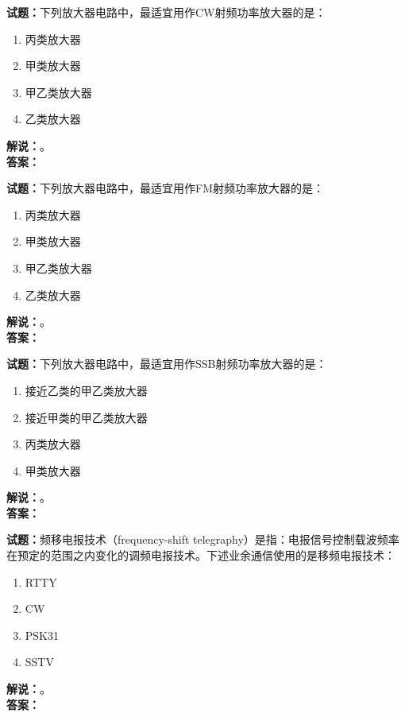 \documentclass{ctexbook}
\begin{document}
\vspace{\baselineskip}

\noindent\textbf{试题：}下列放大器电路中，最适宜用作CW射频功率放大器的是：
\begin{enumerate}[leftmargin=3em]
  \item 丙类放大器
  \item 甲类放大器
  \item 甲乙类放大器
  \item 乙类放大器
\end{enumerate}
\noindent\textbf{解说：}\textbf{}。\\\noindent\textbf{答案：}

\vspace{\baselineskip}

\noindent\textbf{试题：}下列放大器电路中，最适宜用作FM射频功率放大器的是：
\begin{enumerate}[leftmargin=3em]
  \item 丙类放大器
  \item 甲类放大器
  \item 甲乙类放大器
  \item 乙类放大器
\end{enumerate}
\noindent\textbf{解说：}\textbf{}。\\\noindent\textbf{答案：}

\vspace{\baselineskip}

\noindent\textbf{试题：}下列放大器电路中，最适宜用作SSB射频功率放大器的是：
\begin{enumerate}[leftmargin=3em]
  \item 接近乙类的甲乙类放大器
  \item 接近甲类的甲乙类放大器
  \item 丙类放大器
  \item 甲类放大器
\end{enumerate}
\noindent\textbf{解说：}\textbf{}。\\\noindent\textbf{答案：}

\vspace{\baselineskip}

\noindent\textbf{试题：}频移电报技术（frequency-shift telegraphy）是指：电报信号控制载波频率在预定的范围之内变化的调频电报技术。下述业余通信使用的是移频电报技术：
\begin{enumerate}[leftmargin=3em]
  \item RTTY
  \item CW
  \item PSK31
  \item SSTV
\end{enumerate}
\noindent\textbf{解说：}\textbf{}。\\\noindent\textbf{答案：}
\end{document}
